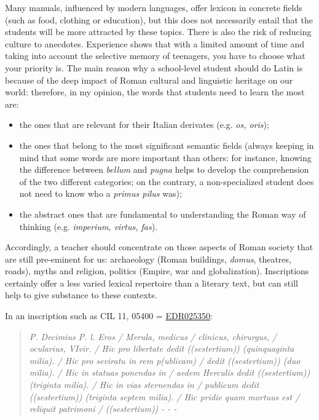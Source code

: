 \documentclass[amsthm,ebook]{saparticle}
\begin{document}
Many manuals, influenced by modern languages, offer lexicon in concrete fields (such as food, clothing or education),
but this does not necessarily entail that the students will be more attracted by these topics. There is also the risk
of reducing culture to anecdotes. Experience shows that with a limited amount of time and taking into account the
selective memory of teenagers, you have to choose what your priority is. The main reason why a school-level student
should do Latin is because of the deep impact of Roman cultural and linguistic heritage on our world: therefore, in my
opinion, the words that students need to learn the most are:

\begin{itemize}
\item the ones that are relevant for their Italian derivates (e.g. \emph{os, oris});
\item the ones that belong to the most significant semantic fields (always keeping in mind that some words are more
important than others: for instance, knowing the difference between \emph{bellum} and \emph{pugna} helps to develop the comprehension
of the two different categories; on the contrary, a non-specialized student does not need to know who a \emph{primus pilus}
was);
\item the abstract ones that are fundamental to understanding the Roman way of thinking (e.g. \emph{imperium, virtus, fas}).
\end{itemize}
Accordingly, a teacher should concentrate on those aspects of Roman society that are still pre-eminent for us:
archaeology (Roman buildings, \emph{domus}, theatres, roads), myths and religion, politics (Empire, war and globalization).
Inscriptions certainly offer a less varied lexical repertoire than a literary text, but can still help to give
substance to these contexts.

In an inscription such as CIL 11, 05400 = \href{http://www.edr-edr.it/edr\_programmi/res\_complex\_comune.php?do=book\&id\_nr=EDR025350}{EDR025350}:

\begin{quotation}
\emph{P. Decimius P. l. Eros / Merula, medicus / clinicus, chirurgus, / ocularius, VIvir. / Hic pro libertate dedit
((sestertium)) (quinquaginta milia). / Hic pro seviratu in rem p(ublicam) / dedit ((sestertium)) (duo milia). / Hic in
statuas ponendas in / aedem Herculis dedit ((sestertium)) (triginta milia). / Hic in vias sternendas in / publicum
dedit ((sestertium)) (triginta septem milia). / Hic pridie quam mortuus est / reliquit patrimoni / ((sestertium)) - - - }
\end{quotation}
\end{document}
